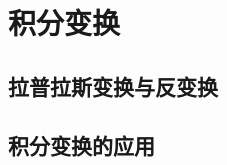 \chapter{积分变换}

% 

\section{拉普拉斯变换与反变换}
\label{sec:laplace_transform_and_inverse_transform}



\section{积分变换的应用}
\label{sec:integral_transform_applications}
